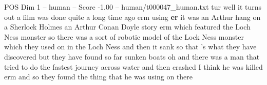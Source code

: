 \begin{textsample}{POS Dim 1 – human – Score -1.00 – human/t000047\_human.txt}  \label{ex:f1_pos_019}
tur well it turns out a film was done quite a long time ago erm using \textbf{er} it was an Arthur hang on a Sherlock Holmes an Arthur Conan Doyle story erm which featured the Loch Ness monster so there was a sort of robotic model of the Lock Ness monster which they used on in the Loch Ness and then it sank so that 's what they have discovered but they have found so far sunken boats oh and there was a man that tried to do the fastest journey across water and then crashed I think he was killed erm and so they found the thing that he was using on there

\end{textsample}
